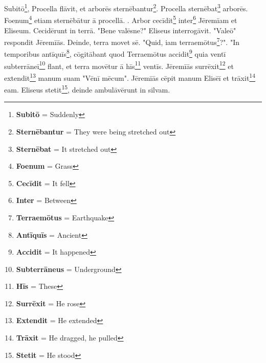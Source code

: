 Subitō\footnote{\textbf{Subitō} = Suddenly}, Procella flāvit, et arborēs sternēbantur\footnote{\textbf{Sternēbantur} = They were being stretched out}. Procella sternēbat\footnote{\textbf{Sternēbat} = It stretched out} arborēs. Foenum\footnote{\textbf{Foenum} = Grass} etiam sternēbātur ā procellā. . Arbor cecīdit\footnote{\textbf{Cecīdit} = It fell} inter\footnote{\textbf{Inter} = Between} Jēremīam et Eliseum. Cecidērunt in terrā. "Bene valēsne?" Eliseus interrogāvit. "Valeō" respondit Jēremīās.  Deinde, terra movet sē. "Quid, iam terraemōtus\footnote{\textbf{Terraemōtus} = Earthquake}?". "In temporibus antīquīs\footnote{\textbf{Antīquīs} = Ancient}, cōgitābant quod Terraemōtus accidit\footnote{\textbf{Accidit} = It happened} quia ventī subterrāneī\footnote{\textbf{Subterrāneus} = Underground} flant, et terra movētur ā hīs\footnote{\textbf{Hīs} = These} ventīs. Jēremīās surrēxit\footnote{\textbf{Surrēxit} = He rose} et extendit\footnote{\textbf{Extendit} = He extended} manum suam "Vēnī mēcum". Jēremīās cēpit manum Elisēī et trāxit\footnote{\textbf{Trāxit} = He dragged, he pulled} eam. Eliseus stetit\footnote{\textbf{Stetit} = He stood}, deinde ambulāvērunt in silvam.